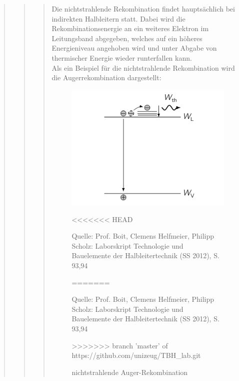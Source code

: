 \begin{quote}
\begin{quote}
\begin{quote}
            Die nichtstrahlende Rekombination findet hauptsächlich bei
            indirekten Halbleitern statt. Dabei wird die Rekombinationsenergie
            an ein weiteres Elektron im Leitungsband abgegeben, welches auf ein
            höheres Energieniveau angehoben wird und unter Abgabe von
            thermischer Energie wieder runterfallen kann.\\
            Als ein Beispiel für die nichtstrahlende Rekombination wird die
            Augerrekombination dargestellt:

            \begin{figure}[H]
                    \centering
                        \includegraphics[scale=0.78, trim = 1cm 0cm 1.5cm 0cm,
                        clip]{./Emissionsbilder/restliches/auger.png}
                        \caption{nichtstrahlende Auger-Rekombination}
<<<<<<< HEAD
                                \begin{center}
                                    \small Quelle: Prof. Boit, Clemens Helfmeier, Philipp Scholz: Laborskript Technologie und Bauelemente der Halbleitertechnik (SS 2012), S. 93,94
                                \end{center}
=======
                        		\begin{center}
                 					\small Quelle: Prof. Boit, Clemens Helfmeier, Philipp Scholz: Laborskript Technologie und Bauelemente der Halbleitertechnik (SS 2012), S. 93,94
             					\end{center}
>>>>>>> branch 'master' of https://github.com/unizeug/TBH_lab.git
                            \label{fig:./Emissionsbilder/restliches/auger.png}
            \end{figure}

            \end{quote}


\end{quote}
\end{quote}
